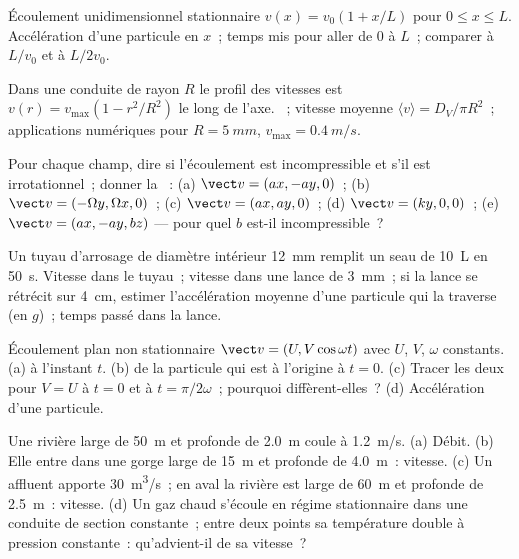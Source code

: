 \begin{exercise}[$\star$]\label{exo:b2:fluid-kinematics:2}
Écoulement unidimensionnel stationnaire $v(x) = v_0(1 + x/L)$ pour $0 \le x \le L$.
Accélération d'une particule en $x$~; temps mis pour aller de $0$ à
$L$~; comparer à $L/v_0$ et à $L/2v_0$.
\end{exercise}

\begin{exercise}[$\star$]\label{exo:b2:fluid-kinematics:3}
Dans une conduite de rayon $R$ le profil des vitesses est $v(r) = v_{\max}(1 -
r^2/R^2)$ le long de l'axe. ~; vitesse moyenne $\langle v\rangle
= D_V/\pi R^2$~; applications numériques pour $R = \qty{5}{mm}$, $v_{\max} = \qty{0.4}{m/s}$.
\end{exercise}

\begin{exercise}[$\star$]\label{exo:b2:fluid-kinematics:4}
Pour chaque champ, dire si l'écoulement est incompressible et s'il
est irrotationnel~; donner la ~: (a) $\vect v = (ax, -ay, 0)$~; (b)
$\vect v = (-\Omega y, \Omega x, 0)$~; (c) $\vect v = (ax, ay, 0)$~; (d) $\vect v =
(ky, 0, 0)$~; (e) $\vect v = (ax, -ay, bz)$ --- pour quel $b$ est-il
incompressible~?
\end{exercise}

\begin{exercise}[$\star\star$]\label{exo:b2:fluid-kinematics:5}
Un tuyau d'arrosage de diamètre intérieur \qty{12}{mm} remplit un seau de \qty{10}{L} en
\qty{50}{s}. Vitesse dans le tuyau~; vitesse dans une lance de \qty{3}{mm}~; si la
lance se rétrécit sur \qty{4}{cm}, estimer l'accélération moyenne d'une
particule qui la traverse (en $g$)~; temps passé dans la lance.
\end{exercise}

\begin{exercise}[$\star\star$]\label{exo:b2:fluid-kinematics:6}
Écoulement plan non stationnaire $\vect v = (U, V\cos\omega t)$ avec $U$, $V$, $\omega$
constants. (a)  à l'instant $t$. (b)  de la particule qui est à
l'origine à $t = 0$. (c) Tracer les deux pour $V = U$ à $t = 0$ et à
$t = \pi/2\omega$~; pourquoi diffèrent-elles~? (d) Accélération d'une particule.
\end{exercise}

\begin{exercise}[$\star\star$]\label{exo:b2:fluid-kinematics:7}
Une rivière large de \qty{50}{m} et profonde de \qty{2.0}{m} coule à \qty{1.2}{m/s}. (a)
Débit. (b) Elle entre dans une gorge large de \qty{15}{m} et profonde de \qty{4.0}{m}~:
vitesse. (c) Un affluent apporte \qty{30}{m^3/s}~; en aval la rivière est
large de \qty{60}{m} et profonde de \qty{2.5}{m}~: vitesse. (d) Un gaz chaud s'écoule en régime stationnaire
dans une conduite de section constante~; entre deux points sa température
double à pression constante~: qu'advient-il de sa vitesse~?
\end{exercise}

